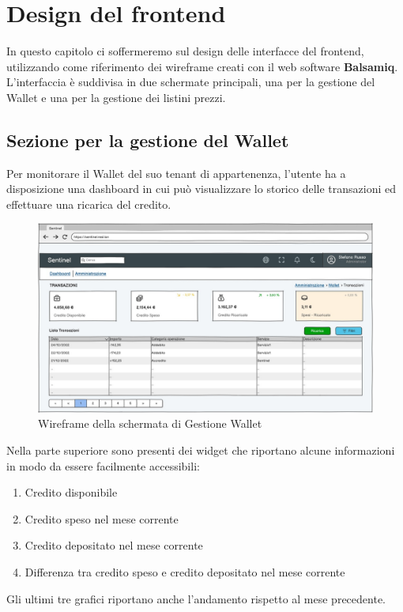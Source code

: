 \chapter{Design del frontend}
In questo capitolo ci soffermeremo sul design delle interfacce del frontend, utilizzando come riferimento dei wireframe creati con il web software \textbf{Balsamiq}.
L'interfaccia \`e suddivisa in due schermate principali, una per la gestione del Wallet e una per la gestione dei listini prezzi.

\section{Sezione per la gestione del Wallet}
Per monitorare il Wallet del suo tenant di appartenenza, l'utente ha a disposizione una dashboard in cui pu\`o visualizzare lo storico delle transazioni ed effettuare una ricarica del credito.

\begin{figure}[H]
  \centering
  \includegraphics[width=12cm]{images/gestione-wallet/mock-gestione-wallet.png}
  \caption{Wireframe della schermata di Gestione Wallet}
\end{figure}

Nella parte superiore sono presenti dei widget che riportano alcune informazioni in modo da essere facilmente accessibili:
\\
\begin{enumerate}
  \item Credito disponibile
  \item Credito speso  nel mese corrente
  \item Credito depositato nel mese corrente
  \item Differenza tra credito speso e credito depositato nel mese corrente
\end{enumerate}
Gli ultimi tre grafici riportano anche l'andamento rispetto al mese precedente.

